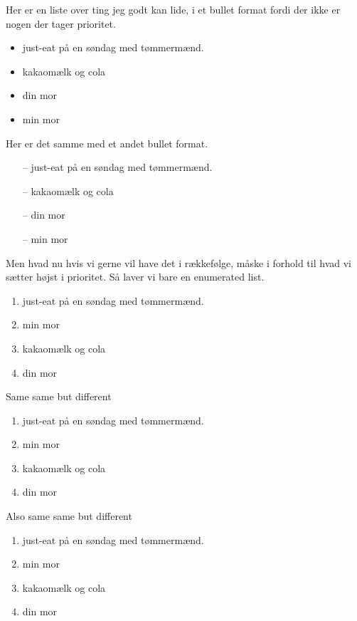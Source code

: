 \documentclass[../template/template.tex]{subfiles}
\begin{document}
Her er en liste over ting jeg godt kan lide, i et bullet format fordi der ikke er nogen der tager prioritet.

\begin{itemize}
    \item just-eat på en søndag med tømmermænd.
    \item kakaomælk og cola
    \item din mor
    \item min mor
\end{itemize}

Her er det samme med et andet bullet format.
\begin{itemize}
    \item[--] just-eat på en søndag med tømmermænd.
    \item[--] kakaomælk og cola
    \item[--] din mor
    \item[--] min mor
\end{itemize}

\noindent Men hvad nu hvis vi gerne vil have det i rækkefølge, måske i forhold til hvad vi sætter højst i prioritet. Så laver vi bare en enumerated list.
\begin{enumerate}
    \item just-eat på en søndag med tømmermænd.
    \item min mor
    \item kakaomælk og cola
    \item din mor
\end{enumerate}

\noindent Same same but different
\renewcommand{\labelenumi}{\theenumi}
\renewcommand{\theenumi}{\Roman{enumi}}
\begin{enumerate}
    \item just-eat på en søndag med tømmermænd.
    \item min mor
    \item kakaomælk og cola
    \item din mor
\end{enumerate}

\noindent Also same same but different
\renewcommand{\theenumi}{\roman{enumi}}
\begin{enumerate}
    \item just-eat på en søndag med tømmermænd.
    \item min mor
    \item kakaomælk og cola
    \item din mor
\end{enumerate}
\end{document}
